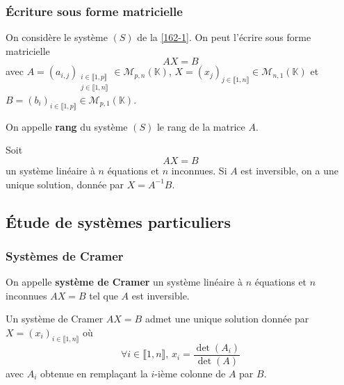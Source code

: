   \subsubsection{Écriture sous forme matricielle}


  \begin{proposition}
    On considère le système $(S)$ de la \cref{162-1}. On peut l'écrire sous forme matricielle
    \[ AX = B \tag{$S$} \]
    avec $A = (a_{i,j})_{\substack{i \in \llbracket 1, p \rrbracket \\ j \in \llbracket 1, n \rrbracket}} \in \mathcal{M}_{p,n}(\mathbb{K})$, $X = (x_j)_{j \in \llbracket 1, n \rrbracket} \in \mathcal{M}_{n,1}(\mathbb{K})$ et $B = (b_i)_{i \in \llbracket 1, p \rrbracket} \in \mathcal{M}_{p,1}(\mathbb{K})$.
  \end{proposition}

  \begin{definition}
    On appelle \textbf{rang} du système $(S)$ le rang de la matrice $A$.
  \end{definition}

  \begin{proposition}
    Soit
    \[ AX = B \]
    un système linéaire à $n$ équations et $n$ inconnues. Si $A$ est inversible, on a une unique solution, donnée par $X = A^{-1}B$.
  \end{proposition}

  \subsection{Étude de systèmes particuliers}

  \subsubsection{Systèmes de Cramer}

  \begin{definition}
    On appelle \textbf{système de Cramer} un système linéaire à $n$ équations et $n$ inconnues $AX = B$ tel que $A$ est inversible.
  \end{definition}

  \begin{theorem}
    Un système de Cramer $AX = B$ admet une unique solution donnée par $X = (x_i)_{i \in \llbracket 1, n \rrbracket}$ où
    \[ \forall i \in \llbracket 1, n \rrbracket, \, x_i = \frac{\det(A_i)}{\det(A)} \]
    avec $A_i$ obtenue en remplaçant la $i$-ième colonne de $A$ par $B$.
  \end{theorem}

